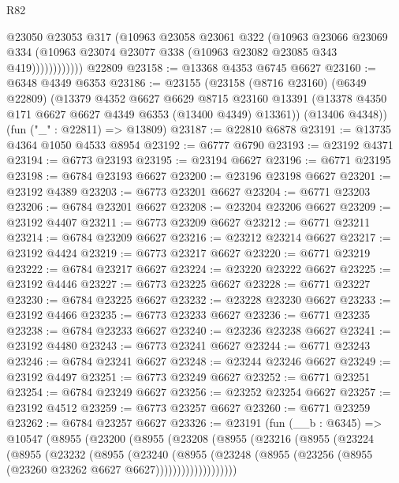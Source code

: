 \begin{lexlean}{R82}
\begin{coremodule}
                    @23050
                    @23053
                    @317
                    (@10963
                      @23058
                      @23061
                      @322
                      (@10963
                        @23066
                        @23069
                        @334
                        (@10963 @23074 @23077 @338 (@10963 @23082 @23085 @343 @419))))))))))))
    @22809
@23158 := @13368 @4353 @6745 @6627
@23160 := @6348 @4349 @6353
@23186 := @23155
    (@23158
      (@8716 @23160)
      (@6349 @22809)
      (@13379
        @4352
        @6627
        @6629
        @8715
        @23160
        @13391
        (@13378 @4350 @171 @6627 @6627 @4349 @6353 (@13400 @4349) @13361))
      (@13406 @4348))
    (fun ("_" : @22811) => @13809)
@23187 := @22810 @6878
@23191 := @13735 @4364 @1050 @4533 @8954
@23192 := @6777 @6790
@23193 := @23192 @4371
@23194 := @6773 @23193
@23195 := @23194 @6627
@23196 := @6771 @23195
@23198 := @6784 @23193 @6627
@23200 := @23196 @23198 @6627
@23201 := @23192 @4389
@23203 := @6773 @23201 @6627
@23204 := @6771 @23203
@23206 := @6784 @23201 @6627
@23208 := @23204 @23206 @6627
@23209 := @23192 @4407
@23211 := @6773 @23209 @6627
@23212 := @6771 @23211
@23214 := @6784 @23209 @6627
@23216 := @23212 @23214 @6627
@23217 := @23192 @4424
@23219 := @6773 @23217 @6627
@23220 := @6771 @23219
@23222 := @6784 @23217 @6627
@23224 := @23220 @23222 @6627
@23225 := @23192 @4446
@23227 := @6773 @23225 @6627
@23228 := @6771 @23227
@23230 := @6784 @23225 @6627
@23232 := @23228 @23230 @6627
@23233 := @23192 @4466
@23235 := @6773 @23233 @6627
@23236 := @6771 @23235
@23238 := @6784 @23233 @6627
@23240 := @23236 @23238 @6627
@23241 := @23192 @4480
@23243 := @6773 @23241 @6627
@23244 := @6771 @23243
@23246 := @6784 @23241 @6627
@23248 := @23244 @23246 @6627
@23249 := @23192 @4497
@23251 := @6773 @23249 @6627
@23252 := @6771 @23251
@23254 := @6784 @23249 @6627
@23256 := @23252 @23254 @6627
@23257 := @23192 @4512
@23259 := @6773 @23257 @6627
@23260 := @6771 @23259
@23262 := @6784 @23257 @6627
@23326 := @23191
    (fun (__b : @6345) =>
    @10547
      (@8955
        (@23200
          (@8955
            (@23208
              (@8955
                (@23216
                  (@8955
                    (@23224
                      (@8955
                        (@23232
                          (@8955
                            (@23240
                              (@8955
                                (@23248
                                  (@8955
                                    (@23256 (@8955 (@23260 @23262 @6627 @6627)))))))))))))))))))

\end{coremodule}
\end{lexlean}
